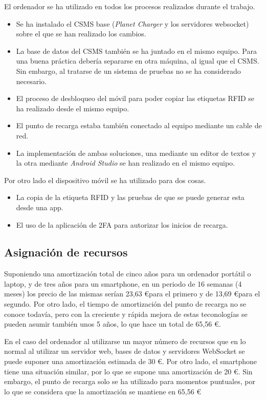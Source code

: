 \documentclass[12pt,a4paper,onecolumn,oneside]{report}
\begin{document}
El ordenador se ha utilizado en todos los procesos realizados durante el trabajo.

\begin{itemize}
\item Se ha instalado el CSMS base (\textit{Planet Charger} y los servidores websocket) sobre el que se han realizado los cambios.
\item La base de datos del CSMS también se ha juntado en el mismo equipo. Para una buena práctica debería separarse en otra máquina, al igual que el CSMS. Sin embargo, al tratarse de un sistema de pruebas no se ha considerado necesario.
\item El proceso de desbloqueo del móvil para poder copiar las etiquetas RFID se ha realizado desde el mismo equipo.
\item El punto de recarga estaba también conectado al equipo mediante un cable de red.
\item La implementación de ambas soluciones, una mediante un editor de textos y la otra mediante \textit{Android Studio} se han realizado en el mismo equipo.
\end{itemize}

Por otro lado el dispositivo móvil se ha utilizado para dos cosas.

\begin{itemize}
\item La copia de la etiqueta RFID y las pruebas de que se puede generar esta desde una app.
\item El uso de la aplicación de 2FA para autorizar los inicios de recarga.
\end{itemize}

\subsection{Asignación de recursos}
Suponiendo una amortización total de cinco años para un ordenador portátil o laptop, y de tres años para un smartphone, en un periodo de 16 semanas (4 meses) los precio de las mismas serían 23,63 \euro para el primero y de 13,69 \euro para el segundo. Por otro lado, el tiempo de amortización del punto de recarga no se conoce todavía, pero con la creciente y rápida mejora de estas teconologías se pueden asumir también unos 5 años, lo que hace un total de 65,56 \euro.

En el caso del ordenador al utilizarse un mayor número de recursos que en lo normal al utilizar un servidor web, bases de datos y servidores WebSocket se puede suponer una amortización estimada de 30 \euro. Por otro lado, el smartphone tiene una situación similar, por lo que se supone una amortización de 20 \euro. Sin embargo, el punto de recarga solo se ha utilizado para momentos puntuales, por lo que se considera que la amortización se mantiene en 65,56 \euro
\end{document}
